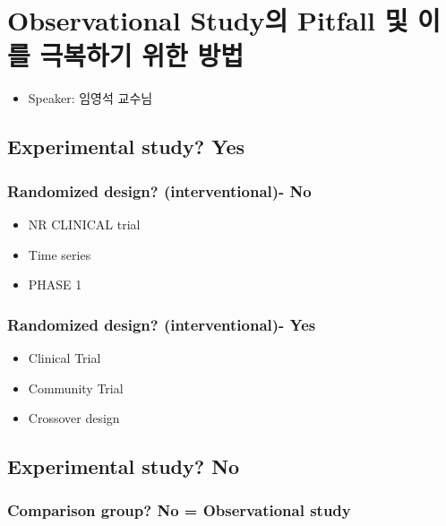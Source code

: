 \documentclass[]{book}
\providecommand{\tightlist}{%
  \setlength{\itemsep}{0pt}\setlength{\parskip}{0pt}}
\begin{document}
\section{Observational Study의 Pitfall 및 이를 극복하기 위한
방법}\label{observational-study-pitfall-----}

\begin{itemize}
\tightlist
\item
  Speaker: 임영석 교수님
\end{itemize}

\subsection{Experimental study? Yes}\label{experimental-study-yes}

\subsubsection{Randomized design? (interventional)-
No}\label{randomized-design-interventional--no}

\begin{itemize}
\tightlist
\item
  NR CLINICAL trial
\item
  Time series
\item
  PHASE 1
\end{itemize}

\subsubsection{Randomized design? (interventional)-
Yes}\label{randomized-design-interventional--yes}

\begin{itemize}
\tightlist
\item
  Clinical Trial
\item
  Community Trial
\item
  Crossover design
\end{itemize}

\subsection{Experimental study? No}\label{experimental-study-no}

\subsubsection{Comparison group? No = Observational
study}\label{comparison-group-no-observational-study}
\end{document}
